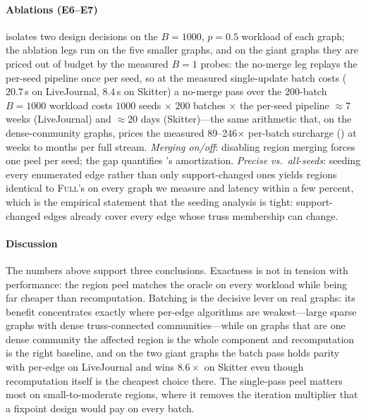 \paragraph{Ablations (E6--E7)}
\label{par:ablation}
 isolates two design decisions on the $B{=}1000$, $p{=}0.5$ workload of each graph; the ablation legs run on the five smaller graphs, and on the giant graphs they are priced out of budget by the measured $B{=}1$ probes: the no-merge leg replays the per-seed pipeline once per seed, so at the measured single-update batch costs ($20.7$\,s on LiveJournal, $8.4$\,s on Skitter) a no-merge pass over the $200$-batch $B{=}1000$ workload costs $1000$ seeds $\times$ $200$ batches $\times$ the per-seed pipeline $\approx 7$ weeks (LiveJournal) and $\approx 20$ days (Skitter)---the same arithmetic that, on the dense-community graphs, prices the measured 89--246$\times$ per-batch surcharge () at weeks to months per full stream.
\emph{Merging on/off}: disabling region merging forces one peel per seed; the gap quantifies 's amortization.
\emph{Precise vs.\ all-seeds}: seeding every enumerated edge rather than only support-changed ones yields regions identical to \textsc{Full}'s on every graph we measure and latency within a few percent, which is the empirical statement that the seeding analysis is tight: support-changed edges already cover every edge whose truss membership can change.

\begin{table}[tb]
\caption{Ablations on the $B{=}1000$, $p{=}0.5$ workload at $T{=}32$: latency (ms/batch) and maximum region size; means of five runs, three on YouTube, LiveJournal, and Skitter (the ``full'' column); the no-merge and all-seeds legs run on the five smaller graphs only, as marked by dashes, and the giant dashes are priced in the text from the measured $B{=}1$ probes.}
\label{tab:ablation}

\end{table}

\paragraph{Discussion}
The numbers above support three conclusions.
Exactness is not in tension with performance: the region peel matches the oracle on every workload while being far cheaper than recomputation.
Batching is the decisive lever on real graphs: its benefit concentrates exactly where per-edge algorithms are weakest---large sparse graphs with dense truss-connected communities---while on graphs that are one dense community the affected region is the whole component and recomputation is the right baseline, and on the two giant graphs the batch pass holds parity with per-edge on LiveJournal and wins $8.6\times$ on Skitter even though recomputation itself is the cheapest choice there.
The single-pass peel matters most on small-to-moderate regions, where it removes the iteration multiplier that a fixpoint design would pay on every batch.
